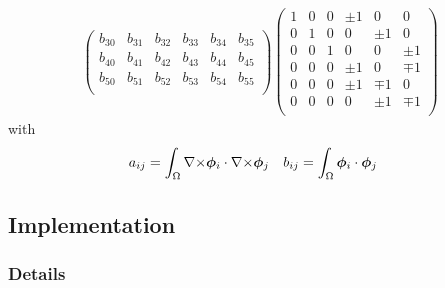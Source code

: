 \begin{gather*}
\begin{pmatrix}
b_{30} & b_{31} & b_{32} & b_{33} & b_{34} & b_{35}\\
b_{40} & b_{41} & b_{42} & b_{43} & b_{44} & b_{45}\\
b_{50} & b_{51} & b_{52} & b_{53} & b_{54} & b_{55}\\
\end{pmatrix}\begin{pmatrix}
1 & 0 & 0 & \pm 1 & 0 & 0\\
0 & 1 & 0 & 0 & \pm 1 & 0\\
0 & 0 & 1 & 0 & 0 & \pm 1\\
0 & 0 & 0 & \pm 1 & 0 & \mp 1\\
0 & 0 & 0 & \pm 1 & \mp 1 & 0\\
0 & 0 & 0 & 0 & \pm 1 & \mp 1\\
\end{pmatrix}
\end{gather*}
with 
\begin{align*}
a_{ij} &= \int_\Omega {\nabla\times}\bm{\phi}_i\cdot{\nabla\times}\bm{\phi}_j &
b_{ij} &= \int_\Omega \bm{\phi}_i\cdot\bm{\phi}_j
\end{align*}

\subsection{Implementation}
\subsubsection{Details}

